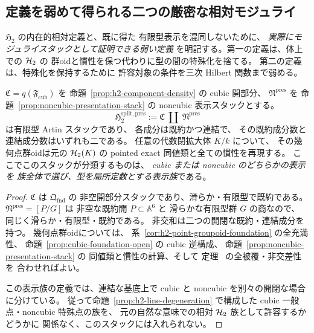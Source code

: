 \subsection{定義を弱めて得られる二つの厳密な相対モジュライ}
\label{subsec:weak-moduli-stack-choices}

$\mathfrak H_2$ の内在的相対定義と、既に得た
有限型表示を混同しないために、
\emph{実際にモジュライスタックとして証明できる弱い定義}
を明記する。第一の定義は、体上での $\mathcal H_2$ の
群oidと慣性を保つ代わりに型の間の特殊化を捨てる。
第二の定義は、特殊化を保持するために
許容対象の条件を三次 Hilbert 関数まで弱める。

\begin{proposition}[型を固定した表示族のモジュライ]
\label{prop:split-h2-presentation-moduli}
$\mathfrak C=q(\mathfrak F_{\mathrm{cub}})$ を
命題~\ref{prop:h2-component-density} の cubic 開部分、
$\mathfrak N^{\mathrm{pres}}$ を
命題~\ref{prop:noncubic-presentation-stack} の
noncubic 表示スタックとする。
\[
 \mathfrak H_2^{\mathrm{split,pres}}
 :=\mathfrak C\ \amalg\ \mathfrak N^{\mathrm{pres}}
 \tag{split-H2}\label{eq:split-h2-presentation-stack}
\]
は有限型 Artin スタックであり、
各成分は既約かつ連結で、
その既約成分数と連結成分数はいずれも二である。
任意の代数閉拡大体 $K/k$ について、
その幾何点群oidは元の $\mathcal H_2(K)$ の
pointed exact 同値類と全ての慣性を再現する。
ここでこのスタックが分類するものは、
\emph{cubic または noncubic のどちらかの表示を
族全体で選び、型を局所定数とする表示族}である。
\end{proposition}
\begin{proof}
$\mathfrak C$ は $\mathfrak Q_{\mathrm{fnd}}$ の
非空開部分スタックであり、滑らか・有限型で既約である。
$\mathfrak N^{\mathrm{pres}}=[P/G]$ は
非空な既約開 $P\subset\mathbb A^6$ と
滑らかな有限型群 $G$ の商なので、
同じく滑らか・有限型・既約である。
非交和は二つの開閉な既約・連結成分を持つ。
幾何点群oidについては、
系~\ref{cor:h2-point-groupoid-foundation} の全充満性、
命題~\ref{prop:cubic-foundation-open} の cubic 逆構成、
命題~\ref{prop:noncubic-presentation-stack} の
同値類と慣性の計算、そして
定理~\cite[\texttt{thm:complete-h2-classification}]{QuadricIntrinsic2026} の全被覆・非交差性を
合わせればよい。

この表示族の定義では、連結な基底上で
cubic と noncubic を別々の開閉な場合に分けている。
従って命題~\ref{prop:h2-line-degeneration} で構成した
cubic 一般点・noncubic 特殊点の族を、
元の自然な意味での相対 $\mathcal H_2$ 族として許容するかどうかに
関係なく、このスタックには入れられない。
\end{proof}

